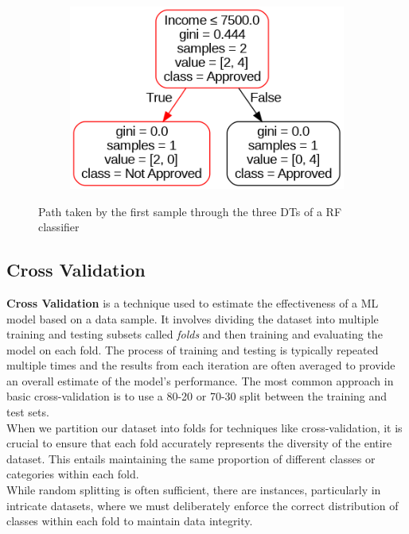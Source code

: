 \begin{figure}[H]
\begin{subfigure}{0.45\linewidth}
    \caption{}
    \label{fig:rfTree1}
  \end{subfigure}
  \begin{subfigure}{0.39\linewidth}
    \includegraphics[width=\linewidth]{graphics/loan_RF_0.png}
    \caption{}
    \label{fig:rfTree2}
  \end{subfigure}
  \caption{Path taken by the first sample through the three DTs of a RF classifier}
  \label{fig:rf}
\end{figure}


\subsection{Cross Validation}
\label{subsec:cross_validation}

\textbf{Cross Validation} is a technique used to estimate the effectiveness of a ML model based on a data sample.
It involves dividing the dataset into multiple training and testing subsets called \textit{folds} and then training and evaluating the model on each fold.
The process of training and testing is typically repeated multiple times and the results from each iteration are often averaged to provide an overall estimate of the model's performance.
The most common approach in basic cross-validation is to use a 80-20 or 70-30 split between the training and test sets.\\
When we partition our dataset into folds for techniques like cross-validation, it is crucial to ensure that each fold accurately represents the diversity of the entire dataset. 
This entails maintaining the same proportion of different classes or categories within each fold.\\ 
While random splitting is often sufficient, there are instances, particularly in intricate datasets, where we must deliberately enforce the correct distribution of classes within each fold to maintain data integrity.
\\

